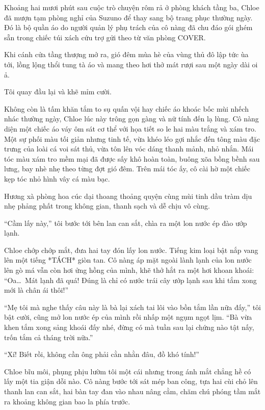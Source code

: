 \documentclass[../main.tex]{subfiles}
\begin{document}
\ct


Khoảng hai mươi phút sau cuộc trò chuyện rôm rả ở phòng khách tầng ba, Chloe đã mượn tạm phòng nghỉ của Suzuno để thay sang bộ trang phục thường ngày. Đó là bộ quần áo do người quản lý phụ trách của cô nàng đã chu đáo gói ghém sẵn trong chiếc túi xách cứu trợ gửi theo từ văn phòng COVER.

Khi cánh cửa tầng thượng mở ra, gió đêm mùa hè của vùng thủ đô lập tức ùa tới, lồng lộng thổi tung tà áo và mang theo hơi thở mát rượi sau một ngày dài oi ả.

Tôi quay đầu lại và khẽ mỉm cười.

Không còn là tấm khăn tắm to sụ quấn vội hay chiếc áo khoác bốc mùi nhếch nhác thường ngày, Chloe lúc này trông gọn gàng và nữ tính đến lạ lùng. Cô nàng diện một chiếc áo váy ôm sát cơ thể với họa tiết so le hai màu trắng và xám tro. Một sự phối màu tối giản nhưng tinh tế, vừa khéo léo gợi nhắc đến tông màu đặc trưng của loài cá voi sát thủ, vừa tôn lên vóc dáng thanh mảnh, nhỏ nhắn. Mái tóc màu xám tro mềm mại đã được sấy khô hoàn toàn, buông xõa bồng bềnh sau lưng, bay nhè nhẹ theo từng đợt gió đêm. Trên mái tóc ấy, cô cài hờ một chiếc kẹp tóc nhỏ hình vây cá màu bạc.

Hương xà phòng hoa cúc dại thoang thoảng quyện cùng mùi tinh dầu tràm dịu nhẹ phảng phất trong không gian, thanh sạch và dễ chịu vô cùng.

``Cầm lấy này,'' tôi bước tới bên lan can sắt, chìa ra một lon nước ép đào ướp lạnh.

Chloe chớp chớp mắt, đưa hai tay đón lấy lon nước. Tiếng kim loại bật nắp vang lên một tiếng *TÁCH* giòn tan. Cô nàng áp mặt ngoài lành lạnh của lon nước lên gò má vẫn còn hơi ửng hồng của mình, khẽ thở hắt ra một hơi khoan khoái: ``Oa\dots\ Mát lạnh đã quá! Đúng là chỉ có nước trái cây ướp lạnh sau khi tắm xong mới là chân ái thôi!''

``Mẹ tôi mà nghe thấy câu này là bà lại xách tai lôi vào bồn tắm lần nữa đấy,'' tôi bật cười, cũng mở lon nước ép của mình rồi nhấp một ngụm ngọt lịm. ``Bà vừa khen tắm xong sảng khoái đấy nhé, đừng có mà tuần sau lại chứng nào tật nấy, trốn tắm cả tháng trời nữa.''

``Xí! Biết rồi, không cần ông phải cằn nhằn đâu, đồ khó tính!''

Chloe bĩu môi, phụng phịu lườm tôi một cái nhưng trong ánh mắt chẳng hề có lấy một tia giận dỗi nào. Cô nàng bước tới sát mép ban công, tựa hai cùi chỏ lên thanh lan can sắt, hai bàn tay đan vào nhau nâng cằm, chăm chú phóng tầm mắt ra khoảng không gian bao la phía trước.
\end{document}
